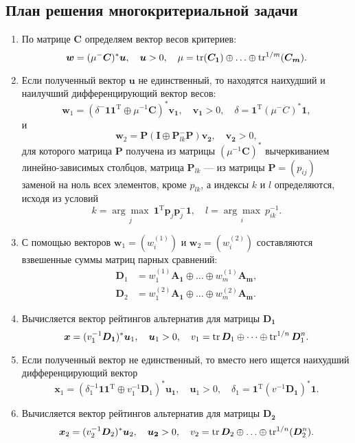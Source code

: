 \documentclass[specialist,
	substylefile = spbu_report.rtx,
	subf,href,colorlinks=true, 12pt]{disser}
\begin{document}
\subsection{План решения многокритериальной задачи}
\begin{enumerate}
	\item По матрице $\boldsymbol{C}$ определяем вектор весов критериев:
	      \[
		      \boldsymbol{w} = (\mu^{-}\boldsymbol{C})^*\boldsymbol{u},\quad  \boldsymbol{u} > 0,\quad \mu = \operatorname{tr}(\boldsymbol{C_1}) \oplus\ldots\oplus \operatorname{tr}^{1/m}(\boldsymbol{C_m}).
	      \]
	\item Если полученный вектор $\boldsymbol{u}$ не единственный, то находятся наихудший и наилучший дифференцирующий вектор весов:
	      \[
		      \boldsymbol{w}_1 = (\delta^-\boldsymbol{11}^\mathrm{T} \oplus \mu^{-1}\boldsymbol{C})^*\boldsymbol{v_1},\quad  \boldsymbol{v_1} > 0,\quad \delta = \boldsymbol{1}^\mathrm{T}(\mu^{-}C)^*\boldsymbol{1},
	      \]
	      и
	      \[
		      \boldsymbol{w}_2 =\boldsymbol{P}(\boldsymbol{I}\oplus\boldsymbol{P}^{-}_{lk}\boldsymbol{P})\boldsymbol{v_2},\quad \boldsymbol{v_2} > 0,
	      \]
	      для которого матрица $\boldsymbol{P}$ получена из матрицы $(\mu^{-1}\boldsymbol{C})^*$ вычеркиванием линейно-зависимых столбцов, матрица $\boldsymbol{P}_{lk}$ --- из матрицы $\boldsymbol{P} = (p_{ij})$ заменой на ноль всех элементов, кроме $p_{lk}$, а индексы $k$ и $l$ определяются, исходя из условий
	      \[
		      k = \underset{j}{\arg\max}~\boldsymbol{1}^\mathrm{T}\boldsymbol{p}_j\boldsymbol{p}^-_j\boldsymbol{1},\quad l = \underset{i}{\arg\max} ~p^{-1}_{ik}.
	      \]
	\item С помощью векторов $\boldsymbol{w}_1 = (w^{(1)}_i)$ и $\boldsymbol{w}_2 = (w^{(2)}_i)$ составляются взвешенные
	      суммы матриц парных сравнений:
	      \begin{align*}
		      \boldsymbol{D}_1 & = w^{(1)}_1\boldsymbol{A_1}\oplus\ldots\oplus w^{(1)}_m\boldsymbol{A_m}, \\
		      \boldsymbol{D}_2 & =w^{(2)}_1\boldsymbol{A_1}\oplus\ldots\oplus w^{(2)}_m\boldsymbol{A_m}.
	      \end{align*}
	\item Вычисляется вектор рейтингов альтернатив для матрицы $\boldsymbol{D_1}$
	      \[
		      \boldsymbol{x} = (v^{-1}_1\boldsymbol{D_1})^*\boldsymbol{u}_1,\quad \boldsymbol{u}_1 > 0,\quad v_1 = \operatorname{tr}\boldsymbol{D}_1\oplus\dots\oplus \operatorname{tr}^{1/n}\boldsymbol{D}_1^n.
	      \]
	\item Если полученный вектор не единственный, то вместо него ищется наихудший дифференцирующий вектор
	      \[
		      \boldsymbol{x}_1 = (\delta^{-1}_1\boldsymbol{11}^\mathrm{T}\oplus v^{-1}_1\boldsymbol{D}_1)^*\boldsymbol{u_1},\quad \boldsymbol{u}_1 > 0,\quad \delta_1 = \boldsymbol{1}^\mathrm{T}(v^{-1}\boldsymbol{D_1})^*\boldsymbol{1}.
	      \]
	\item Вычисляется вектор рейтингов альтернатив для матрицы $\boldsymbol{D_2}$
	      \[
		      \boldsymbol{x}_2 = (v^{-1}_2\boldsymbol{D}_2)^*\boldsymbol{u}_2,\quad \boldsymbol{u_2} > 0,\quad v_2 = \operatorname{tr}\boldsymbol{D}_2\oplus\ldots\oplus\operatorname{tr}^{1/n}(\boldsymbol{D}^n_2).
	      \]


\end{enumerate}
\end{document}
